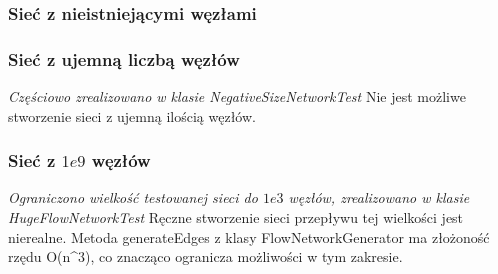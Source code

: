 \subsubsection{Sieć z nieistniejącymi węzłami}


\subsubsection{Sieć z ujemną liczbą węzłów}
\emph{Częściowo zrealizowano w klasie NegativeSizeNetworkTest}
Nie jest możliwe stworzenie sieci z ujemną ilością węzłów.

\subsubsection{Sieć z $1e9$ węzłów}
\emph{Ograniczono wielkość testowanej sieci do $1e3$ węzłów, zrealizowano w klasie HugeFlowNetworkTest}
Ręczne stworzenie sieci przepływu tej wielkości jest nierealne.
Metoda generateEdges z klasy FlowNetworkGenerator ma złożoność rzędu O(n^3),
co znacząco ogranicza możliwości w tym zakresie.


